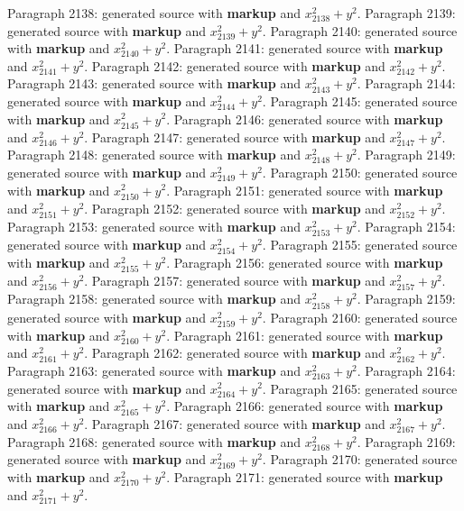 \documentclass{article}
\begin{document}
Paragraph 2138: generated source with \textbf{markup} and $x_{2138}^2 + y^2$.
Paragraph 2139: generated source with \textbf{markup} and $x_{2139}^2 + y^2$.
Paragraph 2140: generated source with \textbf{markup} and $x_{2140}^2 + y^2$.
Paragraph 2141: generated source with \textbf{markup} and $x_{2141}^2 + y^2$.
Paragraph 2142: generated source with \textbf{markup} and $x_{2142}^2 + y^2$.
Paragraph 2143: generated source with \textbf{markup} and $x_{2143}^2 + y^2$.
Paragraph 2144: generated source with \textbf{markup} and $x_{2144}^2 + y^2$.
Paragraph 2145: generated source with \textbf{markup} and $x_{2145}^2 + y^2$.
Paragraph 2146: generated source with \textbf{markup} and $x_{2146}^2 + y^2$.
Paragraph 2147: generated source with \textbf{markup} and $x_{2147}^2 + y^2$.
Paragraph 2148: generated source with \textbf{markup} and $x_{2148}^2 + y^2$.
Paragraph 2149: generated source with \textbf{markup} and $x_{2149}^2 + y^2$.
Paragraph 2150: generated source with \textbf{markup} and $x_{2150}^2 + y^2$.
Paragraph 2151: generated source with \textbf{markup} and $x_{2151}^2 + y^2$.
Paragraph 2152: generated source with \textbf{markup} and $x_{2152}^2 + y^2$.
Paragraph 2153: generated source with \textbf{markup} and $x_{2153}^2 + y^2$.
Paragraph 2154: generated source with \textbf{markup} and $x_{2154}^2 + y^2$.
Paragraph 2155: generated source with \textbf{markup} and $x_{2155}^2 + y^2$.
Paragraph 2156: generated source with \textbf{markup} and $x_{2156}^2 + y^2$.
Paragraph 2157: generated source with \textbf{markup} and $x_{2157}^2 + y^2$.
Paragraph 2158: generated source with \textbf{markup} and $x_{2158}^2 + y^2$.
Paragraph 2159: generated source with \textbf{markup} and $x_{2159}^2 + y^2$.
Paragraph 2160: generated source with \textbf{markup} and $x_{2160}^2 + y^2$.
Paragraph 2161: generated source with \textbf{markup} and $x_{2161}^2 + y^2$.
Paragraph 2162: generated source with \textbf{markup} and $x_{2162}^2 + y^2$.
Paragraph 2163: generated source with \textbf{markup} and $x_{2163}^2 + y^2$.
Paragraph 2164: generated source with \textbf{markup} and $x_{2164}^2 + y^2$.
Paragraph 2165: generated source with \textbf{markup} and $x_{2165}^2 + y^2$.
Paragraph 2166: generated source with \textbf{markup} and $x_{2166}^2 + y^2$.
Paragraph 2167: generated source with \textbf{markup} and $x_{2167}^2 + y^2$.
Paragraph 2168: generated source with \textbf{markup} and $x_{2168}^2 + y^2$.
Paragraph 2169: generated source with \textbf{markup} and $x_{2169}^2 + y^2$.
Paragraph 2170: generated source with \textbf{markup} and $x_{2170}^2 + y^2$.
Paragraph 2171: generated source with \textbf{markup} and $x_{2171}^2 + y^2$.
\end{document}
